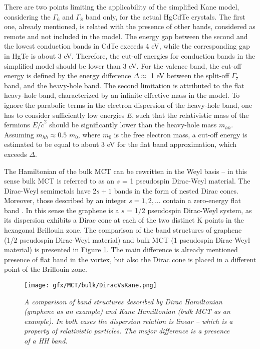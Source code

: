 \documentclass[titlepage,a4paper]{book}
\begin{document}
There are two points limiting the applicability of the simplified Kane model, considering the $\Gamma_6$ and $\Gamma_8$ band only, for the actual HgCdTe crystals. The first one, already mentioned, is related with the presence of other bands, considered as remote and not included in the model. The energy gap between the second and the lowest conduction bands in CdTe exceeds 4 eV, while the corresponding gap in HgTe is about 3 eV. Therefore, the cut-off energies for conduction bands in the simplified model should be lower than 3 eV. For the valence band, the cut-off energy is defined by the energy difference $\Delta \approx$ 1 eV between the split-off $\Gamma_7$ band, and the heavy-hole band. The second limitation is attributed to the flat heavy-hole band, characterized by an infinite effective mass in the model. To ignore the parabolic terms in the electron dispersion of the heavy-hole band, one has to consider sufficiently low energies $E$, such that the relativistic mass of the fermions $E/\tilde{c}^2$ should be significantly lower than the heavy-hole mass $m_{hh}$. Assuming $m_{hh} \approx 0.5$ $m_0$, where $m_0$ is the free electron mass, a cut-off energy is estimated to be equal to about 3 eV for the flat band approximation, which exceeds $\Delta$.

The Hamiltonian of the bulk MCT can be rewritten in the Weyl basis -- in this sense bulk MCT is referred to as an $s$ = 1 pseudospin Dirac-Weyl material. The Dirac-Weyl semimetals have 2$s+1$ bands in the form of nested Dirac cones. Moreover, those described by an integer $s = 1, 2,...$ contain a zero-energy flat band \cite{Malcolm_MCT2}. In this sense the graphene is a $s$ = 1/2 pseudospin Dirac-Weyl system, as its dispersion exhibits a Dirac cone at each of the two distinct K points in the hexagonal Brillouin zone. The comparison of the band structures of graphene (1/2 pseudospin Dirac-Weyl material) and bulk MCT (1 pseudospin Dirac-Weyl material) is presented in Figure \ref{fig:DiracVsKane}. The main difference is already mentioned presence of flat band in the vortex, but also the Dirac cone is placed in a different point of the Brillouin zone.
\begin{figure}[ht]
	\centering
	\texttt{[image: gfx/MCT/bulk/DiracVsKane.png]}
	\vspace{-10pt}
	\caption{\textit{A comparison of band structures described by Dirac Hamiltonian (graphene as an example) and Kane Hamiltonian (bulk MCT as an example). In both cases the dispersion relation is linear -- which is a property of relativistic particles. The major difference is a presence of a HH band.}}
	\label{fig:DiracVsKane}
\end{figure}
\end{document}
